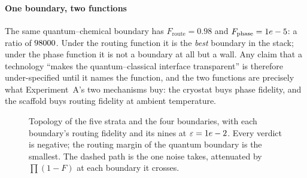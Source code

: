 \documentclass[conference]{IEEEtran}
\theoremstyle{definition}
\begin{document}
\paragraph{One boundary, two functions} The same quantum--chemical boundary has
$F_{\text{route}}=0.98$ and $F_{\text{phase}}=1e-5$: a ratio of
$98000$. Under the routing function it is the \emph{best} boundary in the
stack; under the phase function it is not a boundary at all but a wall. Any claim
that a technology ``makes the quantum--classical interface transparent'' is
therefore under-specified until it names the function, and the two functions are
precisely what Experiment~A's two mechanisms buy: the cryostat buys phase
fidelity, and the scaffold buys routing fidelity at ambient temperature.

\begin{figure}[t]
\centering
{}
\caption{Topology of the five strata and the four boundaries, with each boundary's
routing fidelity and its nines at $\varepsilon=1e-2$. Every verdict is
negative; the routing margin of the quantum boundary is the smallest. The dashed
path is the one noise takes, attenuated by $\prod(1-F)$ at each boundary it
crosses.}
\label{fig:topology}
\end{figure}
\end{document}
